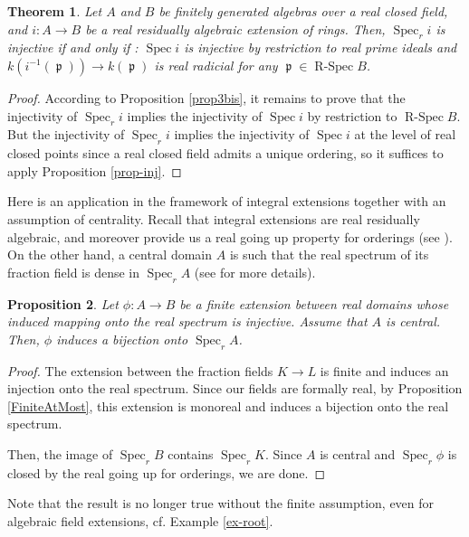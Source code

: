 \documentclass[12pt]{amsart}
\newtheorem{thm}{Theorem}[section]
\newtheorem{prop}[thm]{Proposition}
\theoremstyle{definition}
\DeclareMathOperator{\Sp}{Spec}
\DeclareMathOperator{\ReSp}{R-Spec}
\DeclareMathOperator{\p}{\mathfrak{p}}
\begin{document}
\begin{thm}\label{last-thm} Let $A$ and $B$ be finitely generated algebras over a real closed field, and $i:A\to B$ be a real residually algebraic extension of rings. Then,  $\Sp_r i$ is injective if and only if :
 $\Sp i$ is injective by restriction to real prime ideals and
$k(i^{-1}(\p))\to k(\p)$ is  real radicial for any $\p\in \ReSp B$.
\end{thm}

\begin{proof}
According to Proposition \ref{prop3bis}, it remains to prove that the injectivity of $\Sp_r i$ implies the injectivity of $\Sp i$ by restriction to $\ReSp B$. But the injectivity of $\Sp_r i$ implies the injectivity of $\Sp i$ at the level of real closed points since a real closed field admits a unique ordering, so it suffices to apply Proposition \ref{prop-inj}.
\end{proof}


Here is an application in the framework of integral extensions together with an assumption of centrality.
Recall that integral extensions are real residually algebraic, and moreover provide us a real going up property for orderings (see \cite[Proposition 4.3]{ABR}). On the other hand, a central domain $A$ is such that the real spectrum of its fraction field is dense in $\Sp_r A$ (see \cite{FMQ17} for more details). 

\begin{prop}
Let $\phi:A\to B$ be a finite extension between real domains whose induced mapping onto the real spectrum is injective. Assume that $A$ is central. Then, $\phi$ induces a bijection onto $\Sp_r A$.
\end{prop}	

\begin{proof}
The extension between the fraction fields $K\to L$ is finite and induces an injection onto the real spectrum. 
Since our fields are formally real, by Proposition \ref{FiniteAtMost}, this extension is monoreal and induces a bijection onto the real spectrum. 

Then, the image of $\Sp_r B$ contains $\Sp_rK$. Since $A$ is central and $\Sp_r \phi$ is closed by the real going up for orderings, we are done.
\end{proof}	

Note that the result is no longer true without the finite assumption, even for algebraic field extensions, cf. Example \ref{ex-root}.
\end{document}
